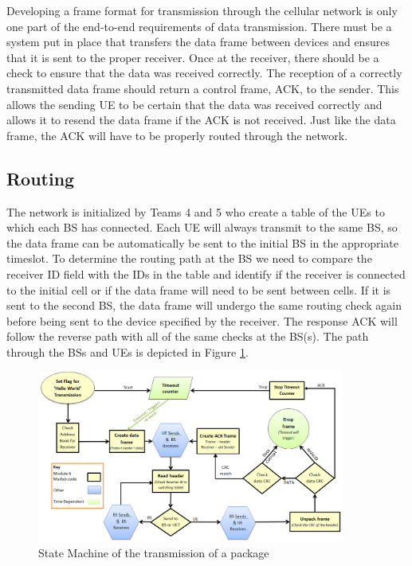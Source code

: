 Developing a frame format for transmission through the cellular network is only one part of the end-to-end requirements of data transmission. There must be a system put in place that transfers the data frame between devices and ensures that it is sent to the proper receiver. Once at the receiver, there should be a check to ensure that the data was received correctly. The reception of a correctly transmitted data frame should return a control frame, ACK, to the sender.  This allows the sending UE to be certain that the data was received correctly and allows it to resend the data frame if the ACK is not received. Just like the data frame, the ACK will have to be properly routed through the network. 

\subsection {Routing}

The network is initialized by Teams 4 and 5 who create a table of the UEs to which each BS has connected. Each UE will always transmit to the same BS, so the data frame can be automatically be sent to the initial BS in the appropriate timeslot.  To determine the routing path at the BS we need to compare the receiver ID field with the IDs in the table and identify if the receiver is connected to the initial cell or if the data frame will need to be sent between cells. If it is sent to the second BS, the data frame will undergo the same routing check again before being sent to the device specified by the receiver. The response ACK will follow the reverse path with all of the same checks at the BS(s). The path through the BSs and UEs is depicted in Figure \ref{fig:stateMachine}.

\begin{figure}[ht]
    \centering
    \includegraphics[width=0.9\textwidth]{State_Machine_yellow.PNG}
    \caption{State Machine of the transmission of a package }
    \label{fig:stateMachine}
\end{figure}


